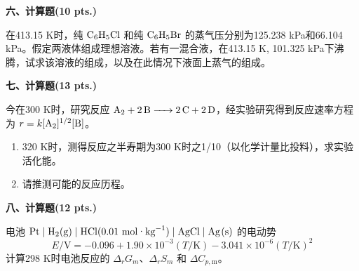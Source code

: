\vspace{0.5cm}
\noindent\textbf{六、计算题(10 pts.)}

在413.15 K时，纯 $\ce{C6H5Cl}$ 和纯 $\ce{C6H5Br}$ 的蒸气压分别为125.238 kPa和66.104 kPa。假定两液体组成理想溶液。若有一混合液，在413.15 K, 101.325 kPa下沸腾，试求该溶液的组成，以及在此情况下液面上蒸气的组成。

\vspace{0.5cm}
\noindent\textbf{七、计算题(13 pts.)}

今在300 K时，研究反应 $\ce{A2 + 2B -> 2C + 2D}$，经实验研究得到反应速率方程为 $r = k[\ce{A2}]^{1/2}[\ce{B}]$。
\begin{enumerate}
    \item 320 K时，测得反应之半寿期为300 K时之1/10（以化学计量比投料），求实验活化能。
    \item 请推测可能的反应历程。
\end{enumerate}

\vspace{0.5cm}
\noindent\textbf{八、计算题(12 pts.)}

电池 $\ce{Pt} \mid \ce{H2(g)} \mid \ce{HCl}(0.01\ \text{mol·kg}^{-1}) \mid \ce{AgCl} \mid \ce{Ag(s)}$ 的电动势
\[
E/\text{V} = -0.096 + 1.90\times10^{-3}(T/\text{K}) - 3.041\times10^{-6}(T/\text{K})^2
\]
计算298 K时电池反应的 $\Delta_r G_m$、$\Delta_r S_m$ 和 $\Delta C_{p,\text{m}}$。